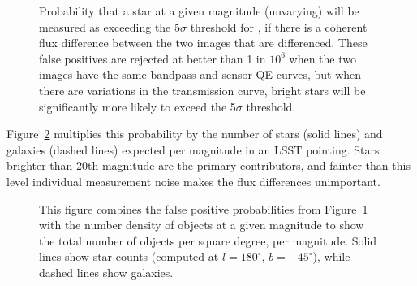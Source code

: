 \documentclass[DM,toc]{lsstdoc}
\begin{document}
\begin{figure}
\caption{Probability that a star at a given magnitude (unvarying) will be
measured as exceeding the 5$\sigma$ threshold for \DIASources, if there is a
coherent flux difference between the two images that are differenced. These
false positives are rejected at better than 1 in $10^6$ when the two images have
the same bandpass and sensor QE curves, but when there are variations in the
transmission curve, bright stars will be significantly more likely to exceed the
5$\sigma$ threshold.
\label{fig:false_positive_prob}}
\end{figure}

Figure~\ref{fig:false_positive_differential} multiplies this probability by the
number of stars (solid lines) and galaxies (dashed lines) expected per magnitude
in an LSST pointing. Stars brighter than 20th magnitude are the primary
contributors, and fainter than this level individual measurement noise makes the
flux differences unimportant.

\begin{figure}
\caption{This figure combines the false positive probabilities from
Figure~\ref{fig:false_positive_prob} with the number density of objects at a
given magnitude to show the total number of objects per square degree, per magnitude.
Solid lines show star counts (computed at $l=180^\circ$, $b=-45^\circ$), while
dashed lines show galaxies.
\label{fig:false_positive_differential}}
\end{figure}
\end{document}
